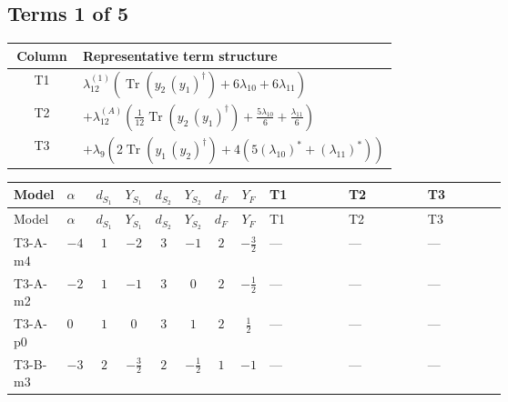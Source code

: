 \documentclass[8pt]{article}
\begin{document}
\begin{landscape}
\subsection*{Terms 1 of 5}
\begin{center}
\begin{tabular}{@{}c >{\raggedright\arraybackslash}p{0.82\linewidth}@{}}
\toprule
Column & Representative term structure \\
\midrule
T1 & \(\displaystyle {\lambda_{12}^{(1)}} (\operatorname{Tr}\!\left({y_2}\,\left({y_1}\right)^{\dagger}\right)+6 {\lambda_{10}}+6 {\lambda_{11}})\) \\
\midrule
T2 & \(\displaystyle +{\lambda_{12}^{(A)}} \left(\frac{1}{12} \operatorname{Tr}\!\left({y_2}\,\left({y_1}\right)^{\dagger}\right)+\frac{5 {\lambda_{10}}}{6}+\frac{{\lambda_{11}}}{6}\right)\) \\
\midrule
T3 & \(\displaystyle +{\lambda_{9}} (2 \operatorname{Tr}\!\left({y_1}\,\left({y_2}\right)^{\dagger}\right)+4 (5 \left({\lambda_{10}}\right)^{*}+\left({\lambda_{11}}\right)^{*}))\) \\
\midrule
\bottomrule
\end{tabular}
\end{center}
\smallskip
\tiny
\begin{longtable}{@{}llcccccc >{\raggedright\arraybackslash}p{0.21\linewidth} >{\raggedright\arraybackslash}p{0.21\linewidth} >{\raggedright\arraybackslash}p{0.21\linewidth}@{}}
\toprule
Model & $\alpha$ & $d_{S_1}$ & $Y_{S_1}$ & $d_{S_2}$ & $Y_{S_2}$ & $d_F$ & $Y_F$ & T1 & T2 & T3 \\
\midrule
\endfirsthead
\toprule
Model & $\alpha$ & $d_{S_1}$ & $Y_{S_1}$ & $d_{S_2}$ & $Y_{S_2}$ & $d_F$ & $Y_F$ & T1 & T2 & T3 \\
\midrule
\endhead
T3-A-m4 & $-4$ & $1$ & $-2$ & $3$ & $-1$ & $2$ & $-\frac{3}{2}$ & --- & --- & --- \\
\midrule
T3-A-m2 & $-2$ & $1$ & $-1$ & $3$ & $0$ & $2$ & $-\frac{1}{2}$ & --- & --- & --- \\
\midrule
T3-A-p0 & $0$ & $1$ & $0$ & $3$ & $1$ & $2$ & $\frac{1}{2}$ & --- & --- & --- \\
\midrule
T3-B-m3 & $-3$ & $2$ & $-\frac{3}{2}$ & $2$ & $-\frac{1}{2}$ & $1$ & $-1$ & --- & --- & --- \\
\midrule

\end{longtable}
\end{landscape}
\end{document}
